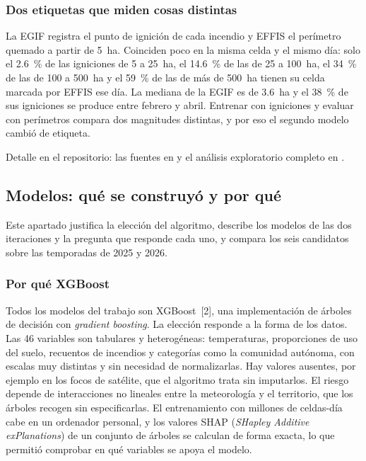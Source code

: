 \documentclass[10pt,a4paper]{article}
\begin{document}
\subsubsection{Dos etiquetas que miden cosas distintas}
\label{an:b1-etiquetas}

La EGIF registra el punto de ignición de cada incendio y EFFIS el perímetro
quemado a partir de 5~ha. Coinciden poco en la misma celda y el mismo día: solo
el 2.6~\% de las igniciones de 5 a 25~ha, el 14.6~\% de las de 25 a 100~ha, el
34~\% de las de 100 a 500~ha y el 59~\% de las de más de 500~ha tienen su celda
marcada por EFFIS ese día. La mediana de la EGIF es de 3.6~ha y el 38~\% de sus
igniciones se produce entre febrero y abril. Entrenar con igniciones y evaluar
con perímetros compara dos magnitudes distintas, y por eso el segundo modelo
cambió de etiqueta.

Detalle en el repositorio: las fuentes en
 y el análisis
exploratorio completo en
.



\subsection{Modelos: qué se construyó y por qué}
\label{an:b2}

Este apartado justifica la elección del algoritmo, describe los modelos de las
dos iteraciones y la pregunta que responde cada uno, y compara los seis
candidatos sobre las temporadas de 2025 y 2026.

\subsubsection{Por qué XGBoost}
\label{an:b2-xgboost}

Todos los modelos del trabajo son XGBoost~[2], una implementación de árboles
de decisión con \emph{gradient boosting}. La elección responde a la forma de
los datos. Las 46 variables son tabulares y heterogéneas: temperaturas,
proporciones de uso del suelo, recuentos de incendios y categorías como la
comunidad autónoma, con escalas muy distintas y sin necesidad de normalizarlas.
Hay valores ausentes, por ejemplo en los focos de satélite, que el algoritmo
trata sin imputarlos. El riesgo depende de interacciones no lineales entre la
meteorología y el territorio, que los árboles recogen sin especificarlas. El
entrenamiento con millones de celdas-día cabe en un ordenador personal, y los
valores SHAP (\emph{SHapley Additive exPlanations}) de un conjunto de árboles
se calculan de forma exacta, lo que permitió comprobar en qué variables se
apoya el modelo.
\end{document}

